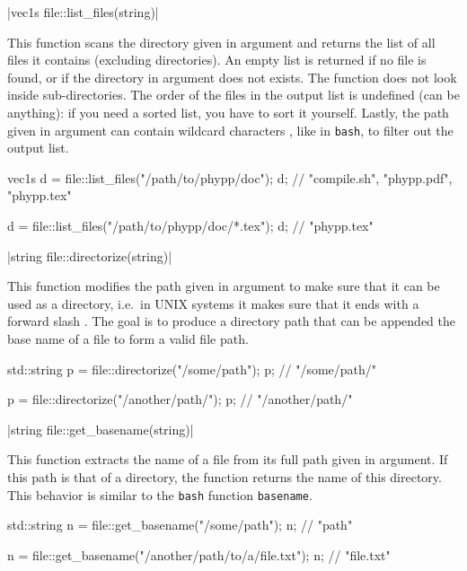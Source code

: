 \funcitem \cppinline|vec1s file::list_files(string)| 

This function scans the directory given in argument and returns the list of all files it contains (excluding directories). An empty list is returned if no file is found, or if the directory in argument does not exists. The function does not look inside sub-directories. The order of the files in the output list is undefined (can be anything): if you need a sorted list, you have to sort it yourself. Lastly, the path given in argument can contain wildcard characters \cppinline{*}, like in \texttt{bash}, to filter out the output list.

\begin{example}
\begin{cppcode}
vec1s d = file::list_files("/path/to/phypp/doc");
d; // {"compile.sh", "phypp.pdf", "phypp.tex"}

d = file::list_files("/path/to/phypp/doc/*.tex");
d; // {"phypp.tex"}
\end{cppcode}
\end{example}

\funcitem \vectorfunc \cppinline|string file::directorize(string)| 

This function modifies the path given in argument to make sure that it can be used as a directory, i.e.~in UNIX systems it makes sure that it ends with a forward slash \cppinline{/}. The goal is to produce a directory path that can be appended the base name of a file to form a valid file path.

\begin{example}
\begin{cppcode}
std::string p = file::directorize("/some/path");
p; // "/some/path/"

p = file::directorize("/another/path/");
p; // "/another/path/"
\end{cppcode}
\end{example}

\funcitem \vectorfunc \cppinline|string file::get_basename(string)| 

This function extracts the name of a file from its full path given in argument. If this path is that of a directory, the function returns the name of this directory. This behavior is similar to the \texttt{bash} function \texttt{basename}.

\begin{example}
\begin{cppcode}
std::string n = file::get_basename("/some/path");
n; // "path"

n = file::get_basename("/another/path/to/a/file.txt");
n; // "file.txt"
\end{cppcode}
\end{example}

